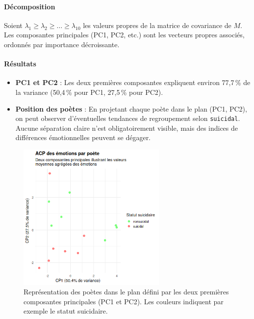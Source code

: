 \documentclass[12pt,a4paper]{article}
\begin{document}
	\paragraph{Décomposition}
	Soient $\lambda_1 \ge \lambda_2 \ge \dots \ge \lambda_{10}$ 
	les valeurs propres de la matrice de covariance de $M$. Les composantes principales 
	(PC1, PC2, etc.) sont les vecteurs propres associés, ordonnés par importance décroissante.
	
	\paragraph{Résultats}
	\begin{itemize}
		\item \textbf{PC1 et PC2} : Les deux premières composantes expliquent environ 77,7\,\% 
		de la variance (50,4\,\% pour PC1, 27,5\,\% pour PC2).
		\item \textbf{Position des poètes} : En projetant chaque poète dans le plan (PC1, PC2), 
		on peut observer d’éventuelles tendances de regroupement selon \texttt{suicidal}.
		Aucune séparation claire n’est obligatoirement visible, 
		mais des indices de différences émotionnelles peuvent se dégager.
	\end{itemize}
	
	\begin{figure}[htbp]
		\centering
		\includegraphics[width=0.65\textwidth]{pca_plot.png}
		\caption{Représentation des poètes dans le plan défini par les deux premières composantes principales (PC1 et PC2). Les couleurs indiquent par exemple le statut suicidaire.}
		\label{fig:pca_plot}
	\end{figure}
	
	
\end{document}
